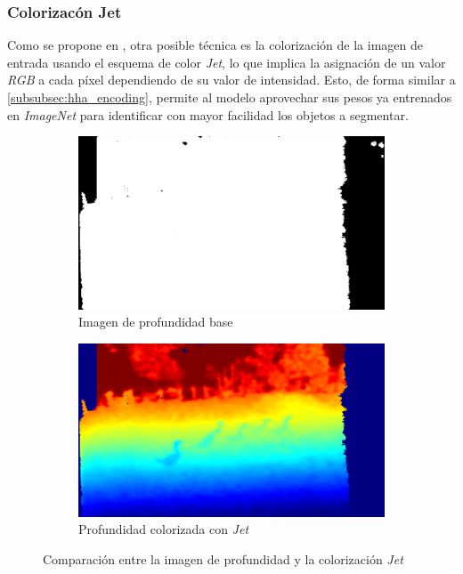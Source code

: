 \documentclass[12pt,a4paper]{report}
\begin{document}
\subsubsection{Colorizacón Jet}
\label{subsubsec:jet_colorization}
Como se propone en \cite{eitel2015multimodaldeeplearningrobust}, otra posible técnica es la colorización de la imagen de entrada usando el esquema de color \textit{Jet}, lo que implica la asignación de un valor \textit{RGB} a cada píxel dependiendo de su valor de intensidad. Esto, de forma similar a \ref{subsubsec:hha_encoding}, permite al modelo aprovechar sus pesos ya entrenados en \textit{ImageNet} para identificar con mayor facilidad los objetos a segmentar.
\begin{figure}
    \centering
    \begin{subfigure}{0.45\textwidth}
        \centering
        \includegraphics[width=\textwidth]{media/data/depth_gueese.png}
        \caption{Imagen de profundidad base}
    \end{subfigure}
    \hfill
    \begin{subfigure}{0.45\textwidth}
        \centering
        \includegraphics[width=\textwidth]{media/data/jet_gueese.png}
        \caption{Profundidad colorizada con \textit{Jet}}
    \end{subfigure}
    \caption{Comparación entre la imagen de profundidad y la colorización \textit{Jet}}
    \label{fig:depth-jet-comparison}
\end{figure}
\end{document}
